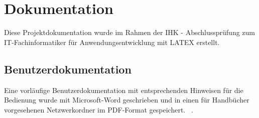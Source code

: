 \section{Dokumentation}
\label{sec:Dokumentation}
Diese Projektdokumentation wurde im Rahmen der IHK - Abschlussprüfung zum IT-Fachinformatiker für Anwendungsentwicklung mit LATEX erstellt.


\subsection{Benutzerdokumentation}
\label{subsec:Benutzerdokumentation}
Eine vorläufige Benutzerdokumentation mit entsprechenden Hinweisen für die Bedienung wurde mit Microsoft-Word geschrieben und in einen für Handbücher vorgesehenen Netzwerkordner im PDF-Format gespeichert. ~.

